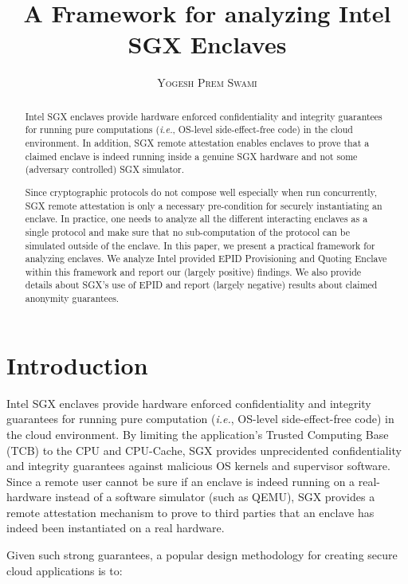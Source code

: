 \documentclass[11pt]{article}
\title{\bf A Framework for analyzing Intel SGX Enclaves}
\author{\textsc{Yogesh Prem Swami}}
\date{\lastupdate}
\newcommand{\ie}{\textit{i.e.}}
\begin{document}

\maketitle

\begin{abstract}
  Intel SGX enclaves  provide hardware
  enforced confidentiality and integrity guarantees for running pure
  computations (\ie, OS-level side-effect-free code) in the cloud
  environment. In addition, SGX remote attestation enables
  enclaves to prove that a claimed enclave is indeed running inside a
  genuine SGX hardware and not some (adversary controlled) SGX
  simulator.

  Since cryptographic protocols do not compose well
  \cite{ucframework} especially when run concurrently, SGX remote
  attestation is only a necessary pre-condition for securely
  instantiating an enclave. In practice, one needs to analyze all the
  different interacting enclaves as a single protocol and make sure
  that no sub-computation of the protocol can be simulated outside of
  the enclave. In this paper, we present a practical framework for
  analyzing enclaves. We analyze Intel provided EPID\cite{epid}
  \textsf{Provisioning} and \textsf{Quoting} Enclave\cite{sgxattest}
  within this framework and report our (largely positive) findings. We
  also provide details about SGX's use of EPID and report
  (largely negative) results about claimed anonymity guarantees.
\end{abstract}

\section{Introduction}
  Intel SGX enclaves\cite{sgxinnov, sgxinnov2} provide hardware
  enforced confidentiality and  integrity guarantees for running pure
  computation (\textit{i.e.}, OS-level side-effect-free code) in the
  cloud environment. By limiting the application's Trusted Computing
  Base (TCB) to the CPU and CPU-Cache, SGX provides unprecidented
  confidentiality and integrity guarantees against malicious OS
  kernels and supervisor software. Since a remote user cannot be sure
  if an enclave is indeed running on a real-hardware instead of a
  software simulator (such as QEMU), SGX provides a remote attestation
  mechanism to prove to third parties that an enclave has indeed been
  instantiated on a real hardware.

  Given such strong guarantees, a popular design methodology for
  creating secure cloud applications is to:
\end{document}
